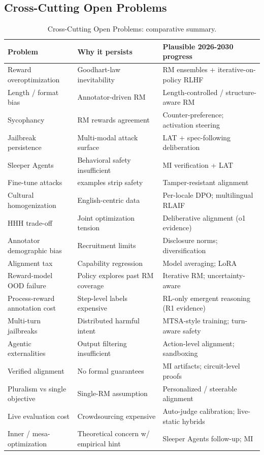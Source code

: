 \documentclass{article}
\begin{document}
\subsection{Cross-Cutting Open Problems}\label{cross-cutting-open-problems}

\begin{table}[t]
\centering
\caption{Cross-Cutting Open Problems: comparative summary.}
\label{tab:cross-cutting-open-problems}
\begin{tabular}{>{\raggedright\arraybackslash}p{0.2727\linewidth}
  >{\raggedright\arraybackslash}p{0.3364\linewidth}
  >{\raggedright\arraybackslash}p{0.3909\linewidth}}
\toprule
Problem & Why it persists & Plausible 2026-2030 progress \\
\midrule
Reward overoptimization & Goodhart-law inevitability & RM ensembles + iterative-on-policy RLHF \\
Length / format bias & Annotator-driven RM & Length-controlled / structure-aware RM \\
Sycophancy & RM rewards agreement & Counter-preference; activation steering \\
Jailbreak persistence & Multi-modal attack surface & LAT + spec-following deliberation \\
Sleeper Agents & Behavioral safety insufficient & MI verification + LAT \\
Fine-tune attacks & 10 examples strip safety & Tamper-resistant alignment \\
Cultural homogenization & English-centric data & Per-locale DPO; multilingual RLAIF \\
HHH trade-off & Joint optimization tension & Deliberative alignment (o1 evidence) \\
Annotator demographic bias & Recruitment limits & Disclosure norms; diversification \\
Alignment tax & Capability regression & Model averaging; LoRA \\
Reward-model OOD failure & Policy explores past RM coverage & Iterative RM; uncertainty-aware \\
Process-reward annotation cost & Step-level labels expensive & RL-only emergent reasoning (R1 evidence) \\
Multi-turn jailbreaks & Distributed harmful intent & MTSA-style training; turn-aware safety \\
Agentic externalities & Output filtering insufficient & Action-level alignment; sandboxing \\
Verified alignment & No formal guarantees & MI artifacts; circuit-level proofs \\
Pluralism vs single objective & Single-RM assumption & Personalized / steerable alignment \\
Live evaluation cost & Crowdsourcing expensive & Auto-judge calibration; live-static hybrids \\
Inner / mesa-optimization & Theoretical concern w/ empirical hint & Sleeper Agents follow-up; MI \\
\end{tabular}
\end{table}
\end{document}
